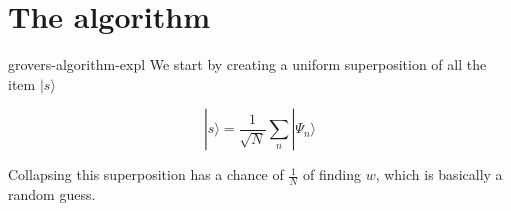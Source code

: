 \documentclass[preview]{standalone}
\begin{document}
\section{The algorithm}

\begin{snippet}{grovers-algorithm-expl}
    We start by creating a uniform superposition of all the item \(|s\rangle\)

    \[
        |s\rangle=\frac{1}{\sqrt{N}}\sum_{n}|\Psi_n\rangle
    \]

    Collapsing this superposition has a chance of \(\frac{1}{N}\) of finding \(w\), which is basically a random guess.
\end{snippet}
\end{document}
